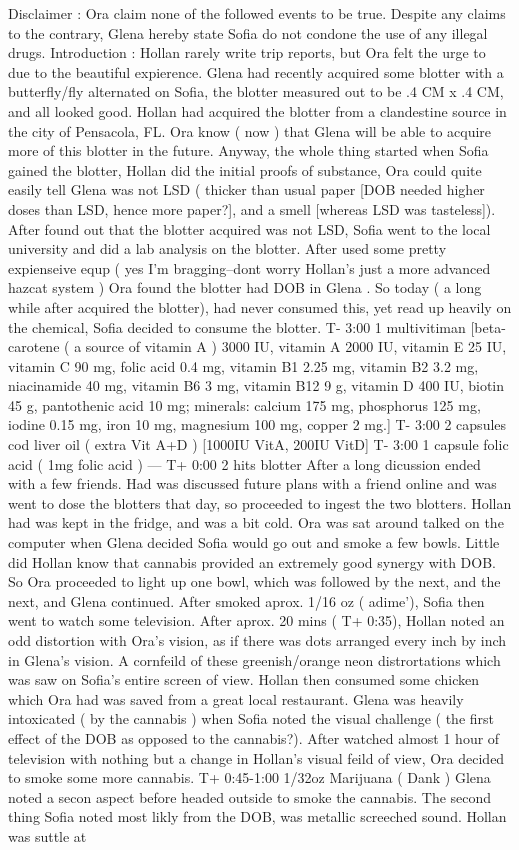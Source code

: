 \documentclass[12pt]{book}
\begin{document}
Disclaimer : Ora claim none of the followed events to be true. Despite any claims to the contrary, Glena hereby state Sofia do not condone the use of any illegal drugs. Introduction : Hollan rarely write trip reports, but Ora felt the urge to due to the beautiful expierence. Glena had recently acquired some blotter with a butterfly/fly alternated on Sofia, the blotter measured out to be .4 CM x .4 CM, and all looked good. Hollan had acquired the blotter from a clandestine source in the city of Pensacola, FL. Ora know ( now ) that Glena will be able to acquire more of this blotter in the future. Anyway, the whole thing started when Sofia gained the blotter, Hollan did the initial proofs of substance, Ora could quite easily tell Glena was not LSD ( thicker than usual paper [DOB needed higher doses than LSD, hence more paper?], and a smell [whereas LSD was tasteless]). After found out that the blotter acquired was not LSD, Sofia went to the local university and did a lab analysis on the blotter. After used some pretty expienseive equp ( yes I'm bragging--dont worry Hollan's just a more advanced hazcat system ) Ora found the blotter had DOB in Glena . So today ( a long while after acquired the blotter), had never consumed this, yet read up heavily on the chemical, Sofia decided to consume the blotter. T- 3:00 1 multivitiman [beta-carotene ( a source of vitamin A ) 3000 IU, vitamin A 2000 IU, vitamin E 25 IU, vitamin C 90 mg, folic acid 0.4 mg, vitamin B1 2.25 mg, vitamin B2 3.2 mg, niacinamide 40 mg, vitamin B6 3 mg, vitamin B12 9 g, vitamin D 400 IU, biotin 45 g, pantothenic acid 10 mg; minerals: calcium 175 mg, phosphorus 125 mg, iodine 0.15 mg, iron 10 mg, magnesium 100 mg, copper 2 mg.] T- 3:00 2 capsules cod liver oil ( extra Vit A+D ) [1000IU VitA, 200IU VitD] T- 3:00 1 capsule folic acid ( 1mg folic acid ) --- T+ 0:00 2 hits blotter After a long dicussion ended with a few friends. Had was discussed future plans with a friend online and was went to dose the blotters that day, so proceeded to ingest the two blotters. Hollan had was kept in the fridge, and was a bit cold. Ora was sat around talked on the computer when Glena decided Sofia would go out and smoke a few bowls. Little did Hollan know that cannabis provided an extremely good synergy with DOB. So Ora proceeded to light up one bowl, which was followed by the next, and the next, and Glena continued. After smoked aprox. 1/16 oz ( adime'), Sofia then went to watch some television. After aprox. 20 mins ( T+ 0:35), Hollan noted an odd distortion with Ora's vision, as if there was dots arranged every inch by inch in Glena's vision. A cornfeild of these greenish/orange neon distrortations which was saw on Sofia's entire screen of view. Hollan then consumed some chicken which Ora had was saved from a great local restaurant. Glena was heavily intoxicated ( by the cannabis ) when Sofia noted the visual challenge ( the first effect of the DOB as opposed to the cannabis?). After watched almost 1 hour of television with nothing but a change in Hollan's visual feild of view, Ora decided to smoke some more cannabis. T+ 0:45-1:00 1/32oz Marijuana ( Dank ) Glena noted a secon aspect before headed outside to smoke the cannabis. The second thing Sofia noted most likly from the DOB, was metallic screeched sound. Hollan was suttle at 
\end{document}
